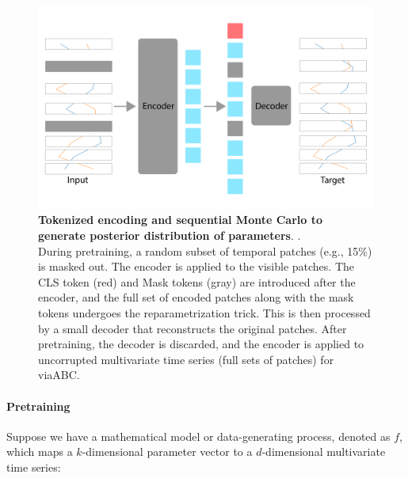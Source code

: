 \documentclass[12pt]{article} %
\newcommand{\para}[1]{\vspace*{-4.5mm}\paragraph{#1}}
\newcommand{\blue}[1]{{\color{magenta}{#1}}}
\begin{document}
\begin{figure}
    \centering
    \includegraphics[width=0.75\linewidth]{figures/model_architecture.png}
    \caption{\textbf{Tokenized encoding and sequential Monte Carlo to generate posterior distribution of parameters}.
\blue{this figure will be the full schematic of VIA-ABC}. \\    
During pretraining, a random subset of temporal patches (e.g., 15\%) is masked out. The encoder is applied to the visible patches. The CLS token (red) and Mask tokens (gray) are introduced after the encoder, and the full set of encoded patches along with the mask tokens undergoes the reparametrization trick. This is then processed by a small decoder that reconstructs the original patches. After pretraining, the decoder is discarded, and the encoder is applied to uncorrupted multivariate time series (full sets of patches) for viaABC.}
    \label{fig:enter-label}
\end{figure}


%
%
%
%
\para{Pretraining}
Suppose we have a mathematical model or data-generating process, denoted as \( f \), which maps a \( k \)-dimensional parameter vector to a \( d \)-dimensional multivariate time series:  
\end{document}
